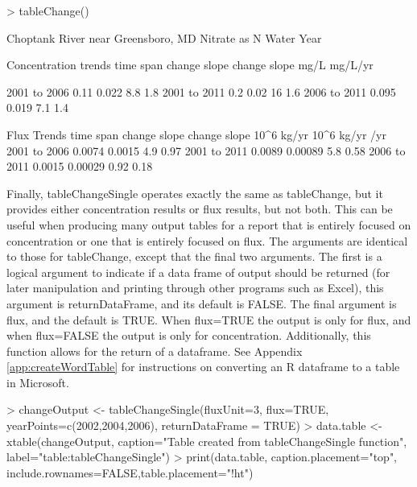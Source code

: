 \documentclass[a4paper,11pt]{article}
\begin{document}
\begin{Schunk}
\begin{Sinput}
> tableChange()
\end{Sinput}
\begin{Soutput}
   Choptank River near Greensboro, MD 
   Nitrate as N
   Water Year 

           Concentration trends
   time span       change     slope    change     slope
                     mg/L   mg/L/yr        %

 2001  to  2006      0.11     0.022       8.8       1.8
 2001  to  2011       0.2      0.02        16       1.6
 2006  to  2011     0.095     0.019       7.1       1.4


                 Flux Trends
   time span          change        slope       change        slope
                  10^6 kg/yr    10^6 kg/yr /yr      %
 2001  to  2006       0.0074       0.0015          4.9         0.97
 2001  to  2011       0.0089      0.00089          5.8         0.58
 2006  to  2011       0.0015      0.00029         0.92         0.18
\end{Soutput}
\end{Schunk}

Finally, tableChangeSingle operates exactly the same as tableChange, but it provides either concentration results or flux results, but not both.  This can be useful when producing many output tables for a report that is entirely focused on concentration or one that is entirely focused on flux.  The arguments are identical to those for tableChange, except that the final two arguments.  The first is a logical argument to indicate if a data frame of output should be returned (for later manipulation and printing through other programs such as Excel), this argument is returnDataFrame, and its default is FALSE.  The final argument is flux, and the default is TRUE.  When flux=TRUE the output is only for flux, and when flux=FALSE the output is only for concentration.  Additionally, this function allows for the return of a dataframe.  See Appendix \ref{app:createWordTable} for instructions on converting an R dataframe to a table in Microsoft.


\begin{Schunk}
\begin{Sinput}
> changeOutput <- tableChangeSingle(fluxUnit=3, flux=TRUE,
         yearPoints=c(2002,2004,2006), returnDataFrame = TRUE)
> data.table <- xtable(changeOutput, 
         caption="Table created from tableChangeSingle function",
         label="table:tableChangeSingle")
> print(data.table, caption.placement="top",
       include.rownames=FALSE,table.placement="!ht")
\end{Sinput}
\end{Schunk}
\end{document}
